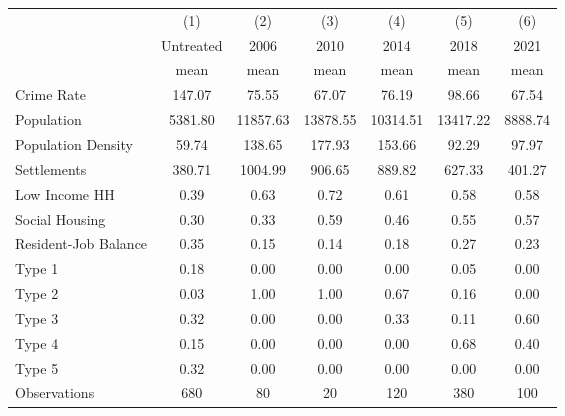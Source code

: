 {
\def\sym#1{\ifmmode^{#1}\else\(^{#1}\)\fi}
\begin{tabular}{l*{6}{c}}
\toprule
                    &\multicolumn{1}{c}{(1)}&\multicolumn{1}{c}{(2)}&\multicolumn{1}{c}{(3)}&\multicolumn{1}{c}{(4)}&\multicolumn{1}{c}{(5)}&\multicolumn{1}{c}{(6)}\\
                    &\multicolumn{1}{c}{Untreated}&\multicolumn{1}{c}{2006}&\multicolumn{1}{c}{2010}&\multicolumn{1}{c}{2014}&\multicolumn{1}{c}{2018}&\multicolumn{1}{c}{2021}\\
                    &        mean&        mean&        mean&        mean&        mean&        mean\\
\midrule
{Crime Rate}        &      147.07&       75.55&       67.07&       76.19&       98.66&       67.54\\
{Population}        &     5381.80&    11857.63&    13878.55&    10314.51&    13417.22&     8888.74\\
{Population Density}&       59.74&      138.65&      177.93&      153.66&       92.29&       97.97\\
{Settlements}       &      380.71&     1004.99&      906.65&      889.82&      627.33&      401.27\\
{Low Income HH}     &        0.39&        0.63&        0.72&        0.61&        0.58&        0.58\\
{Social Housing}    &        0.30&        0.33&        0.59&        0.46&        0.55&        0.57\\
{Resident-Job Balance}&        0.35&        0.15&        0.14&        0.18&        0.27&        0.23\\
{Type 1}            &        0.18&        0.00&        0.00&        0.00&        0.05&        0.00\\
{Type 2}            &        0.03&        1.00&        1.00&        0.67&        0.16&        0.00\\
{Type 3}            &        0.32&        0.00&        0.00&        0.33&        0.11&        0.60\\
{Type 4}            &        0.15&        0.00&        0.00&        0.00&        0.68&        0.40\\
{Type 5}            &        0.32&        0.00&        0.00&        0.00&        0.00&        0.00\\
\midrule
Observations        &         680&          80&          20&         120&         380&         100\\
\bottomrule
\end{tabular}
}
